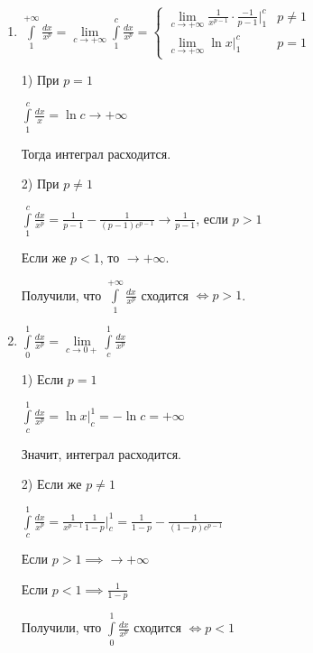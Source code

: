 \begin{example}\slashns
	
	\begin{enumerate}
		\item
		$\int\limits_1^{+\infty} \frac{dx}{x^p} = \lim\limits_{c \to +\infty} \int\limits_1^c \frac{dx}{x^p} = \begin{cases}\lim\limits_{c \to +\infty} \frac1{x^{p-1}} \cdot \frac{-1}{p-1} \Big|_1^c & p \ne 1 \\ 
		\lim\limits_{c \to +\infty} \ln x \Big|_1^c & p = 1\end{cases}$
		
		1) При $p=1$
		
		$\int\limits_1^c \frac{dx}{x} = \ln c \to +\infty$
		
		Тогда интеграл расходится.
		
		2) При $p \ne 1$
		
		$\int\limits_1^c \frac{dx}{x^p} = \frac1{p-1} - \frac1{(p-1)c^{p-1}} \to \frac1{p-1}$, если $p>1$
		
		Если же $p < 1$, то $\to +\infty$.
		
		Получили, что $\int\limits_1^{+\infty} \frac{dx}{x^p}$ сходится $\iff p > 1$.
		
		\item 
		$\int\limits_0^{1} \frac{dx}{x^p} = \lim\limits_{c \to 0+} \int\limits_c^1 \frac{dx}{x^p}$
		
		1) Если $p = 1$
		
		$\int\limits_c^1 \frac{dx}{x^p} = \ln x \Big|_c^1 = -\ln c = +\infty$
		
		Значит, интеграл расходится.
		
		2) Если же $p \ne 1$
		
		$\int\limits_c^1 \frac{dx}{x^p} = \frac1{x^{p-1}} \frac{1}{1-p}\Big|_c^1 = \frac1{1-p} - \frac1{(1-p)c^{p-1}}$
		
		Если $p > 1 \implies \to + \infty$
		
		Если $p < 1 \implies \frac1{1-p}$
		
		Получили, что $\int\limits_0^{1} \frac{dx}{x^p}$ сходится $\iff p < 1$
	\end{enumerate}
\end{example}

